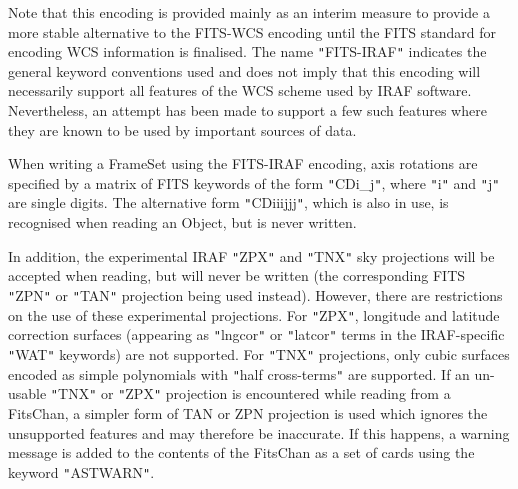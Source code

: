 \documentclass[twoside,11pt]{article}
\begin{document}
{{      
      Note that this encoding is provided mainly as an interim measure to
      provide a more stable alternative to the FITS-WCS encoding until the
      FITS standard for encoding WCS information is finalised.  The name
      {\tt{"}}FITS-IRAF{\tt{"}} indicates the general keyword conventions used and does
      not imply that this encoding will necessarily support all features of
      the WCS scheme used by IRAF software. Nevertheless, an attempt has
      been made to support a few such features where they are known to be
      used by important sources of data.

      When writing a FrameSet using the FITS-IRAF encoding, axis rotations
      are specified by a matrix of FITS keywords of the form {\tt{"}}CDi\_j{\tt{"}}, where
      {\tt{"}}i{\tt{"}} and {\tt{"}}j{\tt{"}} are single digits. The alternative form {\tt{"}}CDiiijjj{\tt{"}}, which
      is also in use, is recognised when reading an Object, but is never
      written.

      In addition, the experimental IRAF {\tt{"}}ZPX{\tt{"}} and {\tt{"}}TNX{\tt{"}} sky projections will
      be accepted when reading, but will never be written (the corresponding
      FITS {\tt{"}}ZPN{\tt{"}} or {\tt{"}}TAN{\tt{"}} projection being used instead). However, there
      are restrictions on the use of these experimental projections. For
      {\tt{"}}ZPX{\tt{"}}, longitude and latitude correction surfaces (appearing as
      {\tt{"}}lngcor{\tt{"}} or {\tt{"}}latcor{\tt{"}} terms in the IRAF-specific {\tt{"}}WAT{\tt{"}} keywords) are
      not supported. For {\tt{"}}TNX{\tt{"}} projections, only cubic surfaces encoded as
      simple polynomials with {\tt{"}}half cross-terms{\tt{"}} are supported. If an
      un-usable {\tt{"}}TNX{\tt{"}} or {\tt{"}}ZPX{\tt{"}} projection is encountered while reading
      from a FitsChan, a simpler form of TAN or ZPN projection is used
      which ignores the unsupported features and may therefore be
      inaccurate. If this happens, a warning message is added to the
      contents of the FitsChan as a set of cards using the keyword {\tt{"}}ASTWARN{\tt{"}}.

}}
\end{document}
